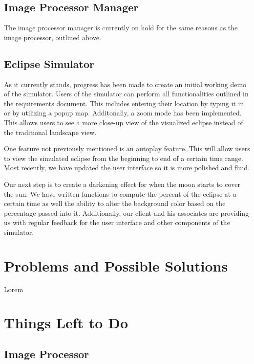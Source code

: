 \documentclass[10pt, onecolumn, draftclsnofoot, letterpaper, compsoc]{IEEEtran}
\begin{document}
\subsection{Image Processor Manager}

The image processor manager is currently on hold for the same reasons as the image processor,
outlined above.

\subsection{Eclipse Simulator}

As it currently stands, progress has been made to create an initial working
demo of the simulator. Users of the simulator can perform all functionalities
outlined in the requirements document. This includes entering their location by
typing it in or by utilizing a popup map. Additonally, a zoom mode has been
implemented. This allows users to see a more close-up view of the visualized
eclipse instead of the traditional landscape view.

One feature not previously mentioned is an autoplay feature. This will allow
users to view the simulated eclipse from the beginning to end of a certain
time range. Most recently, we have updated the user interface so it is more
polished and fluid.

Our next step is to create a darkening effect for when the moon starts to
cover the sun. We have written functions to compute the percent of the eclipse
at a certain time as well the ability to alter the background color based on
the percentage passed into it. Additionally, our client and his associates
are providing us with regular feedback for the user interface and other 
components of the simulator.


\section{Problems and Possible Solutions}

Lorem


\section{Things Left to Do}

\subsection{Image Processor}
\end{document}
